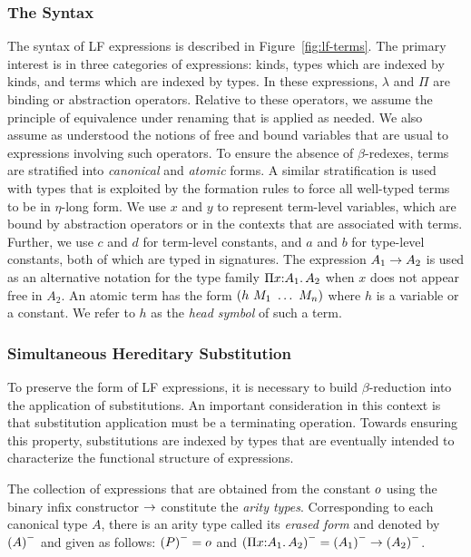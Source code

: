 \subsubsection{The Syntax} The syntax of LF expressions is described in
Figure~\ref{fig:lf-terms}.
%
The primary interest is in three categories of expressions:
kinds, types which are indexed by kinds, and terms which are indexed
by types. 
%
In these expressions, $\lambda$ and $\Pi$ are binding or abstraction
operators.
%
Relative to these operators, we assume the principle of
equivalence under renaming that is applied as needed. 
%
We also assume as understood the notions of free and bound
variables that are usual to expressions involving such operators.
%
To ensure the absence of $\beta$-redexes, terms are stratified into
\emph{canonical} and \emph{atomic} forms.  
%
A similar stratification is used with types that is exploited by the
formation rules to force all well-typed terms to be in $\eta$-long
form.
%
We use $x$ and $y$ to represent term-level variables, which are bound
by abstraction operators or in the contexts that are associated with
terms. 
%
Further, we use $c$ and $d$ for term-level constants, and $a$
and $b$ for type-level constants, both of which are typed in
signatures. 
%
The expression $A_1\rightarrow A_2$ is used as an alternative notation
for the type family $\Pi {x}{:}{A_1}.{\mkern 3mu} A_2$ when $x$ does
not appear free in $A_2$. 
%
An atomic term has the form $(h\  M_1\  \ldots\  M_n)$ where $h$
is a variable or a constant.
%
We refer to $h$ as the \emph{head symbol} of such a term. 

\subsubsection{Simultaneous Hereditary Substitution}

To preserve the form of LF expressions, it is necessary to build 
$\beta$-reduction into the application of substitutions.
%
An important consideration in this context is that substitution
application must be a terminating operation. 
%
Towards ensuring this property, substitutions are indexed by types
that are eventually intended to characterize the functional structure
of expressions. 

\begin{definition}\label{def:aritytypes}
The collection of expressions that are obtained from the constant
$o$ using the binary infix constructor $\rightarrow$ constitute the
{\it arity types}.
%
Corresponding to each canonical type $A$, there is an arity type
called its {\it erased form} and denoted by ${(A)}^{-}$ and given as
follows: ${(P)}^{-} = o$ and ${(\Pi {x}{:}{A_1}.{\mkern 3mu} A_2)}^{-} =
{(A_1)}^{-}\rightarrow {(A_2)}^{-}$.  

\end{definition}

